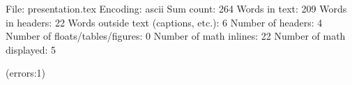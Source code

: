 
File: presentation.tex
Encoding: ascii
Sum count: 264
Words in text: 209
Words in headers: 22
Words outside text (captions, etc.): 6
Number of headers: 4
Number of floats/tables/figures: 0
Number of math inlines: 22
Number of math displayed: 5

(errors:1)
